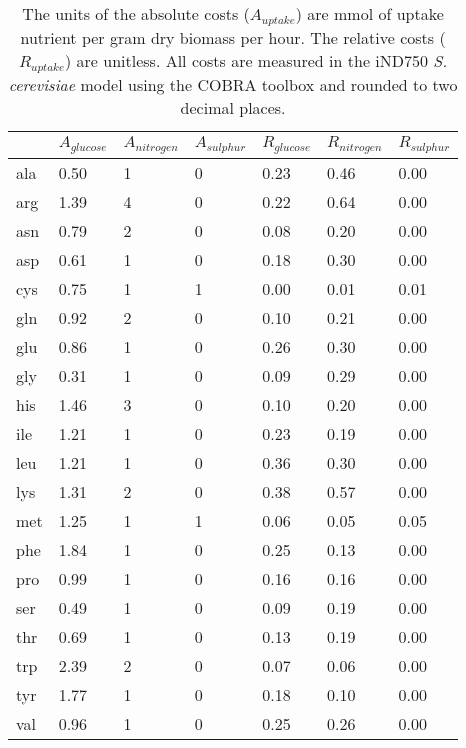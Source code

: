 \begin{table}
\begin{footnotesize}
  \begin{tabular}{ p{1cm} *{6}{p{1.9cm}} }
  \toprule
      & $A_{glucose}$ & $A_{nitrogen}$ & $A_{sulphur}$ & $R_{glucose}$ & $R_{nitrogen}$ & $R_{sulphur}$ \\ \midrule
      ala & 0.50 & 1 & 0 & 0.23 & 0.46 & 0.00 \\
      arg & 1.39 & 4 & 0 & 0.22 & 0.64 & 0.00 \\
      asn & 0.79 & 2 & 0 & 0.08 & 0.20 & 0.00 \\
      asp & 0.61 & 1 & 0 & 0.18 & 0.30 & 0.00 \\
      cys & 0.75 & 1 & 1 & 0.00 & 0.01 & 0.01 \\
      gln & 0.92 & 2 & 0 & 0.10 & 0.21 & 0.00 \\
      glu & 0.86 & 1 & 0 & 0.26 & 0.30 & 0.00 \\
      gly & 0.31 & 1 & 0 & 0.09 & 0.29 & 0.00 \\
      his & 1.46 & 3 & 0 & 0.10 & 0.20 & 0.00 \\
      ile & 1.21 & 1 & 0 & 0.23 & 0.19 & 0.00 \\
      leu & 1.21 & 1 & 0 & 0.36 & 0.30 & 0.00 \\
      lys & 1.31 & 2 & 0 & 0.38 & 0.57 & 0.00 \\
      met & 1.25 & 1 & 1 & 0.06 & 0.05 & 0.05 \\
      phe & 1.84 & 1 & 0 & 0.25 & 0.13 & 0.00 \\
      pro & 0.99 & 1 & 0 & 0.16 & 0.16 & 0.00 \\
      ser & 0.49 & 1 & 0 & 0.09 & 0.19 & 0.00 \\
      thr & 0.69 & 1 & 0 & 0.13 & 0.19 & 0.00 \\
      trp & 2.39 & 2 & 0 & 0.07 & 0.06 & 0.00 \\
      tyr & 1.77 & 1 & 0 & 0.18 & 0.10 & 0.00 \\
      val & 0.96 & 1 & 0 & 0.25 & 0.26 & 0.00 \\ \bottomrule
  \end{tabular}
\end{footnotesize}
\caption[\emph{S. cerevisiae} estimated absolute and relative amino acid costs]{The units of the absolute costs ($A_{uptake}$) are mmol of uptake nutrient per gram dry biomass per hour. The relative costs ($R_{uptake}$) are unitless. All costs are measured in the iND750 \emph{S. cerevisiae} model using the COBRA toolbox and rounded to two decimal places.} 
\label{table:estimated_costs}
\end{table}

